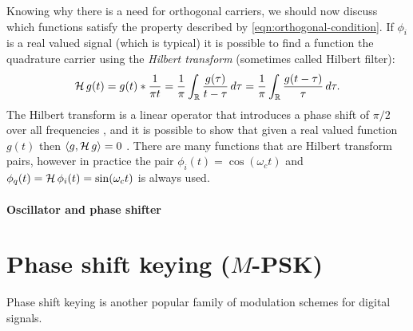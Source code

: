 Knowing why there is a need for orthogonal carriers, we should now discuss which functions satisfy the property described by \eqref{eqn:orthogonal-condition}. If \(\phi_i\) is a real valued signal (which is typical) it is possible to find a function the quadrature carrier using the \emph{Hilbert transform} (sometimes called Hilbert filter):
\begin{equation}
	\operatorname{\mathcal{H}} g(t) = g(t) * \frac{1}{\pi t}
		= \frac{1}{\pi} \int_\mathbb{R} \frac{g(\tau)}{t - \tau} \,d\tau
		= \frac{1}{\pi} \int_\mathbb{R} \frac{g(t - \tau)}{\tau} \,d\tau.
\end{equation}
The Hilbert transform is a linear operator that introduces a phase shift of \(\pi / 2\) over all frequencies \cite{Hsu,Gallager}, and it is possible to show that given a real valued function \(g(t)\) then \(\langle g, \operatorname{\mathcal{H}} g \rangle = 0\) \cite{Kschischang,Kneubuehler}. There are many functions that are Hilbert transform pairs, however in practice the pair \(\phi_i(t) = \cos(\omega_c t)\) and \(\phi_q(t) = \operatorname{\mathcal{H}} \phi_i(t) = \sin(\omega_c t)\) is always used.

\paragraph{Oscillator and phase shifter}



\section{Phase shift keying (\(M\)-PSK)}

Phase shift keying is another popular family of modulation schemes for digital signals.



